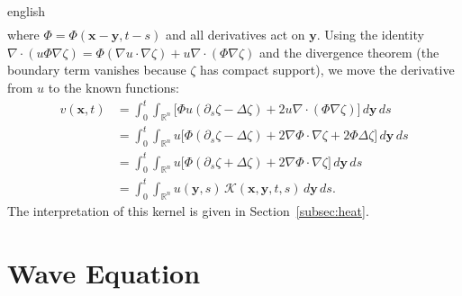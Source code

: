 \documentclass[0000.tex]{subfiles}
\begin{document}
\begin{hyphenrules}{english}
\begin{align}
\end{align}
where $\Phi=\Phi(\mathbf{x}-\mathbf{y},t-s)$ and all derivatives act on $\mathbf{y}$. Using the identity
$\nabla\cdot(u\Phi\nabla\zeta)=\Phi(\nabla u\cdot\nabla\zeta)+u\nabla\cdot(\Phi\nabla\zeta)$ and the
divergence theorem (the boundary term vanishes because $\zeta$ has compact support), we move the
derivative from $u$ to the known functions:
\begin{align}
  v(\mathbf{x},t)&=\int_0^t\!\!\int_{\mathbb{R}^n}\Big[\Phi u(\partial_s\zeta-\Delta\zeta)+2u\nabla\cdot(\Phi\nabla\zeta)\Big]\,d\mathbf{y}\,d s \label{eq:cut-6}\\
         &=\int_0^t\!\!\int_{\mathbb{R}^n}u\Big[\Phi(\partial_s\zeta-\Delta\zeta)+2\nabla\Phi\cdot\nabla\zeta+2\Phi\Delta\zeta\Big]\,d\mathbf{y}\,d s \label{eq:cut-7}\\
         &=\int_0^t\!\!\int_{\mathbb{R}^n}u\Big[\Phi(\partial_s\zeta+\Delta\zeta)+2\nabla\Phi\cdot\nabla\zeta\Big]\,d\mathbf{y}\,d s \label{eq:cut-8}\\
         &=\int_0^t\!\!\int_{\mathbb{R}^n}u(\mathbf{y},s)\,\mathcal{K}(\mathbf{x},\mathbf{y},t,s)\,d\mathbf{y}\,d s. \label{eq:app-cut-9}
\end{align}
The interpretation of this kernel is given in Section~\ref{subsec:heat}.

\section{Wave Equation}\label{app-sec:wave}


\end{hyphenrules}
\end{document}
